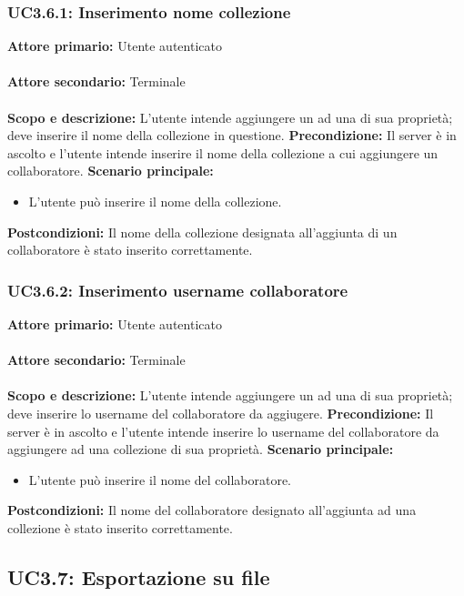 \documentclass{scalatekids-article}
\begin{document}
\subsubsection{UC3.6.1: Inserimento nome collezione}

\textbf{Attore primario:} Utente autenticato\\ \\
\textbf{Attore secondario:} Terminale\\ \\
\textbf{Scopo e descrizione:} L'utente intende aggiungere un  ad una  di sua proprietà; deve inserire il nome della collezione in questione.
\textbf{Precondizione:} Il server è in ascolto e l'utente intende inserire il nome della collezione a cui aggiungere un collaboratore.
\textbf{Scenario principale:}
\begin{itemize}
\item L'utente può inserire il nome della collezione.
\end{itemize}
\textbf{Postcondizioni:} Il nome della collezione designata all'aggiunta di un collaboratore è stato inserito correttamente.

\subsubsection{UC3.6.2: Inserimento username collaboratore}

\textbf{Attore primario:} Utente autenticato\\ \\
\textbf{Attore secondario:} Terminale\\ \\
\textbf{Scopo e descrizione:} L'utente intende aggiungere un  ad una  di sua proprietà; deve inserire lo username del collaboratore da aggiugere.
\textbf{Precondizione:} Il server è in ascolto e l'utente intende inserire lo username del collaboratore da aggiungere ad una collezione di sua proprietà.
\textbf{Scenario principale:}
\begin{itemize}
\item L'utente può inserire il nome del collaboratore.
\end{itemize}
\textbf{Postcondizioni:} Il nome del collaboratore designato all'aggiunta ad una collezione è stato inserito correttamente.

\subsection{UC3.7: Esportazione su file}
\end{document}
